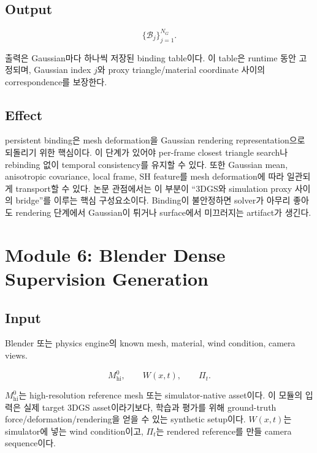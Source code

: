 \documentclass[11pt,a4paper]{article}
\begin{document}
\subsection*{Output}

\begin{equation}
\{\mathcal{B}_j\}_{j=1}^{N_G}.
\end{equation}

출력은 Gaussian마다 하나씩 저장된 binding table이다.
이 table은 runtime 동안 고정되며, Gaussian index $j$와 proxy triangle/material coordinate 사이의 correspondence를 보장한다.

\subsection*{Effect}

persistent binding은 mesh deformation을 Gaussian rendering representation으로 되돌리기 위한 핵심이다. 이 단계가 있어야 per-frame closest triangle search나 rebinding 없이 temporal consistency를 유지할 수 있다. 또한 Gaussian mean, anisotropic covariance, local frame, SH feature를 mesh deformation에 따라 일관되게 transport할 수 있다.
논문 관점에서는 이 부분이 ``3DGS와 simulation proxy 사이의 bridge''를 이루는 핵심 구성요소이다.
Binding이 불안정하면 solver가 아무리 좋아도 rendering 단계에서 Gaussian이 튀거나 surface에서 미끄러지는 artifact가 생긴다.

\section{Module 6: Blender Dense Supervision Generation}

\subsection*{Input}

Blender 또는 physics engine의 known mesh, material, wind condition, camera views.

\begin{equation}
M_{\mathrm{hi}}^0,\qquad W(x,t),\qquad \Pi_t.
\end{equation}

$M_{\mathrm{hi}}^0$는 high-resolution reference mesh 또는 simulator-native asset이다.
이 모듈의 입력은 실제 target 3DGS asset이라기보다, 학습과 평가를 위해 ground-truth force/deformation/rendering을 얻을 수 있는 synthetic setup이다.
$W(x,t)$는 simulator에 넣는 wind condition이고, $\Pi_t$는 rendered reference를 만들 camera sequence이다.
\end{document}

